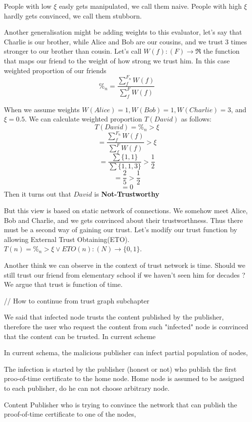 \documentclass[nostrict]{szablonPG}
\begin{document}
People with low $\xi$ easly gets manipulated, we call them naive.
People with high $\xi$ hardly gets convinced, we call them stubborn. 

Another generalisation might be adding weights to this evaluator, let's say that Charlie is our brother, while Alice and Bob are our cousins, and we trust 3 times stronger to our brother than cousin. Let's call $W(f): (F) \rightarrow \Re$ the function that maps our friend to the weight of how strong we trust him. In this case weighted proportion of our friends \[\%_n = \frac{\sum\limits_f^{F_n} W(f)}{\sum\limits_f^{F} W(f)}\]

When we assume weights $W(Alice) = 1, W(Bob) = 1, W(Charlie) = 3$, and $\xi = 0.5$. We can calculate weighted proportion $T(David)$ as follows:
\[T(David) = \%_n > \xi\]
\[= \frac{\sum\limits_f^{F_n} W(f)}{\sum\limits_f^{F} W(f)} > \xi\]
\[= \frac{\sum \{1,1\}}{\sum\{1,1,3\}} > \frac{1}{2}\]
\[= \frac{2}{5} > \frac{1}{2}\]
\[= 0\]
Then it turns out that $David$ is \textbf{Not-Trustworthy}

But this view is based on static network of connections. We somehow meet Alice, Bob and Charlie, and we gets convinced about their trustworthness. Thus there must be a second way of gaining our trust. Let's modify our trust function by allowing External Trust Obtaining(ETO). $T(n) = \%_n > \xi \lor ETO(n) : (N) \rightarrow \{0,1\}$. 

Another think we can observe in the context of trust network is time. Should we still trust our friend from elementary school if we haven't seen him for decades ? We argue that trust is function of time.

// How to continue from trust graph subchapter 



We said that infected node trusts the content published by the publisher, therefore the user who request the content from such "infected" node is convinced that the content can be trusted. In current scheme 

In current schema, the malicious publisher can infect partial population of nodes, 



 The infection is started by the publisher (honest or not) who publish the first proo-of-time certificate to the home node. Home node is assumed to be assigned to each publisher, do he can not choose arbitrary node. 


Content Publisher who is trying to convince the network that can publish the proof-of-time certificate to one of the nodes, 
\end{document}

